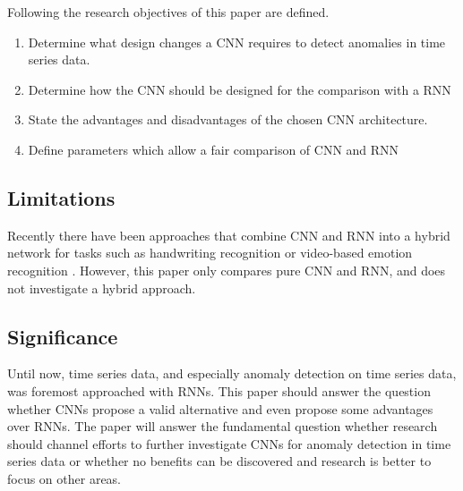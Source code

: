 Following the research objectives of this paper are defined.


\begin{enumerate}
	\item Determine what design changes a CNN requires to detect anomalies in time series data.
	\item Determine how the CNN should be designed for the comparison with a RNN
	\item State the advantages and disadvantages of the chosen CNN architecture.
	\item Define parameters which allow a fair comparison of CNN and RNN
\end{enumerate}

\subsection{Limitations}

Recently there have been approaches that combine CNN and RNN into a hybrid network for tasks such as handwriting recognition or video-based emotion recognition \parencite{Dutta2018} \parencite{Fan2016}. However, this paper only compares pure CNN and RNN, and does not investigate a hybrid approach.


\subsection{Significance}

Until now, time series data, and especially anomaly detection on time series data, was foremost approached with RNNs. This paper should answer the question whether CNNs propose a valid alternative and even propose some advantages over RNNs. The paper will answer the fundamental question whether research should channel efforts to further investigate CNNs for anomaly detection in time series data or whether no benefits can be discovered and research is better to focus on other areas. 

